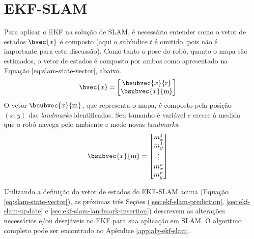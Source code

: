 \section{EKF-SLAM}
Para aplicar o EKF na solução de SLAM, é necessário entender 
como o vetor de estados $\bvec{x}$ é composto (aqui o subíndice $t$ é omitido, pois não é importante para esta discussão). Como tanto a pose do 
robô, quanto o mapa são estimados, o vetor de estados é composto por ambos como apresentado na Equação \ref{eq:slam-state-vector}, abaixo.
\begin{equation}
  \bvec{x} = \begin{bmatrix}
    \bsubvec{x}{\mathrm{r}} \\
    \bsubvec{x}{\mathrm{m}}
  \end{bmatrix}
  \label{eq:slam-state-vector}
\end{equation}
O vetor $\bsubvec{x}{\mathrm{m}}$, que representa o mapa, é composto pela posição $(x, y)$ das \textit{landmarks} identificadas. 
Seu tamanho é variável e cresce à medida que o robô navega pelo ambiente e 
mede novas \textit{landmarks}.
\begin{equation}
  \bsubvec{x}{\mathrm{m}} = \begin{bmatrix}
    m_x^1\\
    m_y^1\\
    \vdots\\
    m_x^n\\
    m_y^n
  \end{bmatrix}
  \label{eq:feature-map}
\end{equation}

Utilizando a definição do vetor de estados do EKF-SLAM acima (Equação \ref{eq:slam-state-vector}), as próximas três Seções (\ref{sec:ekf-slam-prediction}, \ref{sec:ekf-slam-update} e \ref{sec:ekf-slam-landmark-insertion}) descrevem as alterações necessários e/ou desejáveis no EKF para sua aplicação em SLAM. O algoritmo completo pode ser encontrado no Apêndice \ref{app:alg-ekf-slam}.

